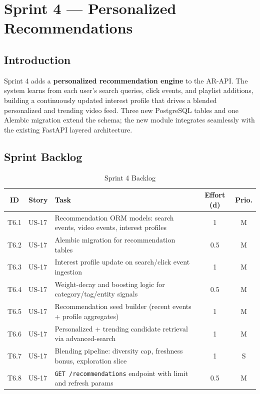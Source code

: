 \chapter{Sprint 4 — Personalized Recommendations}

\section*{Introduction}

Sprint 4 adds a \textbf{personalized recommendation engine} to the AR-API. The system learns
from each user's search queries, click events, and playlist additions, building a continuously
updated interest profile that drives a blended personalized and trending video feed. Three new
PostgreSQL tables and one Alembic migration extend the schema; the new module integrates
seamlessly with the existing FastAPI layered architecture.

\section{Sprint Backlog}

\begin{table}[H]
\centering
\caption{Sprint 4 Backlog}
\label{tab:sprint4_backlog_rec}
\begin{tabularx}{\textwidth}{clXcc}
\toprule
\textbf{ID} & \textbf{Story} & \textbf{Task} & \textbf{Effort (d)} & \textbf{Prio.} \\
\midrule
T6.1 & US-17 & Recommendation ORM models: search events, video events, interest profiles & 1   & M \\
T6.2 & US-17 & Alembic migration for recommendation tables                              & 0.5 & M \\
T6.3 & US-17 & Interest profile update on search/click event ingestion                 & 1   & M \\
T6.4 & US-17 & Weight-decay and boosting logic for category/tag/entity signals          & 0.5 & M \\
T6.5 & US-17 & Recommendation seed builder (recent events + profile aggregates)        & 1   & M \\
T6.6 & US-17 & Personalized + trending candidate retrieval via advanced-search         & 1   & M \\
T6.7 & US-17 & Blending pipeline: diversity cap, freshness bonus, exploration slice     & 1   & S \\
T6.8 & US-17 & \texttt{GET /recommendations} endpoint with limit and refresh params    & 0.5 & M \\
\bottomrule
\end{tabularx}
\end{table}

